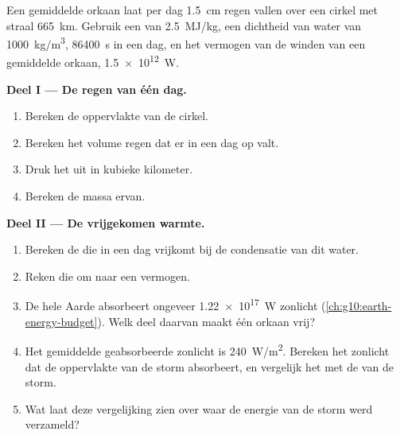 \begin{problem}
\label{pb:g10:storms-and-cyclones:1}
Een gemiddelde orkaan laat per dag \qty{1.5}{cm} regen vallen over een cirkel met
straal \qty{665}{km}. Gebruik een  van \qty{2.5}{MJ/kg}, een
dichtheid van water van \qty{1000}{kg/m^3}, \qty{86400}{s} in een dag, en het
vermogen van de winden van een gemiddelde orkaan, \qty{1.5e12}{W}.

\medskip
\noindent\textbf{Deel I --- De regen van één dag.}
\begin{enumerate}
  \item Bereken de oppervlakte van de cirkel.
  \item Bereken het volume regen dat er in een dag op valt.
  \item Druk het uit in kubieke kilometer.
  \item Bereken de massa ervan.
\end{enumerate}

\medskip
\noindent\textbf{Deel II --- De vrijgekomen warmte.}
\begin{enumerate}[resume]
  \item Bereken de  die in een dag vrijkomt bij de condensatie van
        dit water.
  \item Reken die om naar een vermogen.
  \item De hele Aarde absorbeert ongeveer \qty{1.22e17}{W} zonlicht
        (\cref{ch:g10:earth-energy-budget}). Welk deel daarvan maakt één orkaan
        vrij?
  \item Het gemiddelde geabsorbeerde zonlicht is \qty{240}{W/m^2}. Bereken het
        zonlicht dat de oppervlakte van de storm absorbeert, en vergelijk het met
        de  van de storm.
  \item Wat laat deze vergelijking zien over waar de energie van de storm werd
        verzameld?
\end{enumerate}


\end{problem}
